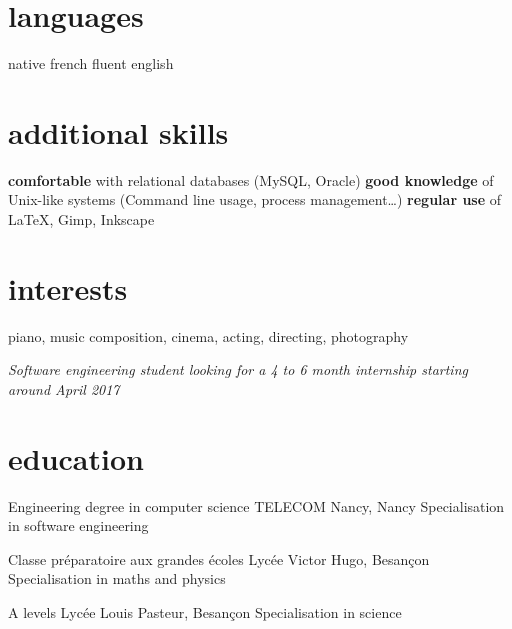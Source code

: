 \documentclass[]{lemaki-cv}
\begin{document}
\begin{aside}
		\section{languages}
		\footnotesize native french
		\footnotesize fluent english
		\section{additional skills}
		\footnotesize\textbf{comfortable} with relational databases (MySQL, Oracle)
		\footnotesize\textbf{good knowledge} of Unix-like systems (Command line usage, process
		management\ldots)
		\footnotesize\textbf{regular use} of LaTeX, Gimp, Inkscape
		\section{interests}
		\footnotesize piano, music composition, cinema, acting, directing, photography
	\end{aside}

		\emph{\small Software engineering student looking for a 4 to 6 month internship
		starting around April 2017}


		\section{education}

		\begin{entrylist}


			{Engineering degree {\normalfont{}in computer science}}
			{TELECOM Nancy, Nancy}
			{Specialisation in software engineering}


			{Classe préparatoire aux grandes écoles}
			{Lycée Victor Hugo, Besançon}
			{Specialisation in maths and physics}


			{A levels}
			{Lycée Louis Pasteur, Besançon}
			{Specialisation in science}


		\end{entrylist}
\end{document}
